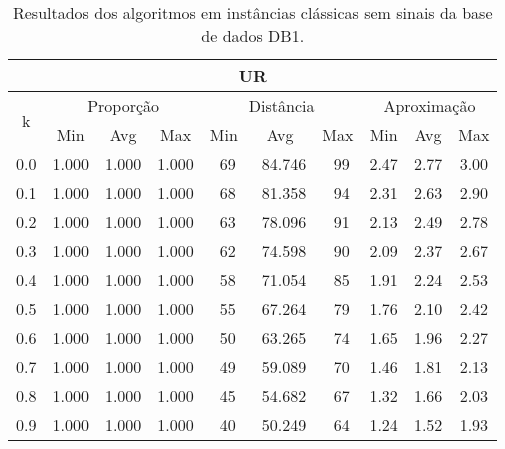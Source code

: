 \begin{table}[!p]
\caption{Resultados dos algoritmos em instâncias clássicas sem sinais da base de dados DB1.}
\label{table:AELVTSMQ}
\begin{center}
\scriptsize
{\def\arraystretch{1.05}\tabcolsep=8pt
\begin{tabular}{|c|c|c|c|c|c|c|c|c|c|}
\hline
\multicolumn{10}{|c|}{\bf UR}                                                                                             \\ \hline
\multirow{2}{*}{k} & \multicolumn{3}{c|}{Proporção}  & \multicolumn{3}{c|}{Distância} & \multicolumn{3}{c|}{Aproximação}  \\ \cline{2-10}
                   & Min       & Avg      & Max      & Min      & Avg      & Max     & Min     & Avg   & Max              \\ \hline
0.0                & 1.000     & 1.000    & 1.000    & ~69      & ~84.746  & ~99     & 2.47    & 2.77  & 3.00             \\ \hline
0.1                & 1.000     & 1.000    & 1.000    & ~68      & ~81.358  & ~94     & 2.31    & 2.63  & 2.90             \\ \hline
0.2                & 1.000     & 1.000    & 1.000    & ~63      & ~78.096  & ~91     & 2.13    & 2.49  & 2.78             \\ \hline
0.3                & 1.000     & 1.000    & 1.000    & ~62      & ~74.598  & ~90     & 2.09    & 2.37  & 2.67             \\ \hline
0.4                & 1.000     & 1.000    & 1.000    & ~58      & ~71.054  & ~85     & 1.91    & 2.24  & 2.53             \\ \hline
0.5                & 1.000     & 1.000    & 1.000    & ~55      & ~67.264  & ~79     & 1.76    & 2.10  & 2.42             \\ \hline
0.6                & 1.000     & 1.000    & 1.000    & ~50      & ~63.265  & ~74     & 1.65    & 1.96  & 2.27             \\ \hline
0.7                & 1.000     & 1.000    & 1.000    & ~49      & ~59.089  & ~70     & 1.46    & 1.81  & 2.13             \\ \hline
0.8                & 1.000     & 1.000    & 1.000    & ~45      & ~54.682  & ~67     & 1.32    & 1.66  & 2.03             \\ \hline
0.9                & 1.000     & 1.000    & 1.000    & ~40      & ~50.249  & ~64     & 1.24    & 1.52  & 1.93             \\ \hline

\end{tabular}}
\end{center}
\end{table}
